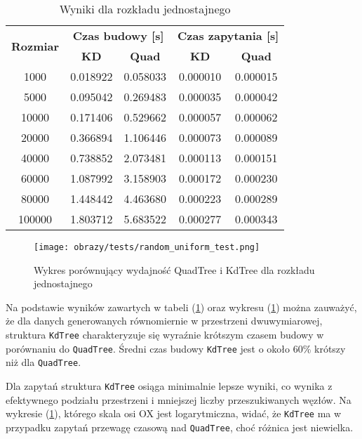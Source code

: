 \documentclass[12pt]{article}
\begin{document}
\nopagebreak
\begin{table}[h]
\centering
\caption{Wyniki dla rozkładu jednostajnego}
\label{tab:random_uniform_test}
\begin{tabular}{ccccc}
\toprule
\multirow{2}{*}{\textbf{Rozmiar}} & \multicolumn{2}{c}{\textbf{Czas budowy [s]}} & \multicolumn{2}{c}{\textbf{Czas zapytania [s]}} \\
\cmidrule(lr){2-3} \cmidrule(lr){4-5}
 & \textbf{KD} & \textbf{Quad} & \textbf{KD} & \textbf{Quad} \\
\midrule
1000   & 0.018922 & 0.058033 & 0.000010 & 0.000015 \\
5000   & 0.095042 & 0.269483 & 0.000035 & 0.000042 \\
10000  & 0.171406 & 0.529662 & 0.000057 & 0.000062 \\
20000  & 0.366894 & 1.106446 & 0.000073 & 0.000089 \\
40000  & 0.738852 & 2.073481 & 0.000113 & 0.000151 \\
60000  & 1.087992 & 3.158903 & 0.000172 & 0.000230 \\
80000  & 1.448442 & 4.463680 & 0.000223 & 0.000289 \\
100000 & 1.803712 & 5.683522 & 0.000277 & 0.000343 \\
\bottomrule
\end{tabular}
\end{table}

\nopagebreak
\begin{figure}[h]
    \centering
    \texttt{[image: obrazy/tests/random\_uniform\_test.png]}
    \caption{Wykres porównujący wydajność QuadTree i KdTree dla rozkładu jednostajnego}
    \label{fig:random_uniform_tests}
\end{figure}

\noindent Na podstawie wyników zawartych w tabeli (\ref{tab:random_uniform_test}) oraz wykresu (\ref{fig:random_uniform_tests}) można zauważyć, że dla danych generowanych równomiernie w przestrzeni dwuwymiarowej, struktura \texttt{KdTree} charakteryzuje się wyraźnie krótszym czasem budowy w porównaniu do \texttt{QuadTree}. Średni czas budowy \texttt{KdTree} jest o około 60\% krótszy niż dla \texttt{QuadTree}. 

\noindent Dla zapytań struktura \texttt{KdTree} osiąga minimalnie lepsze wyniki, co wynika z efektywnego podziału przestrzeni i mniejszej liczby przeszukiwanych węzłów. Na wykresie (\ref{fig:random_uniform_tests}), którego skala osi OX jest logarytmiczna, widać, że \texttt{KdTree} ma w przypadku zapytań przewagę czasową nad \texttt{QuadTree}, choć różnica jest niewielka.
\end{document}
